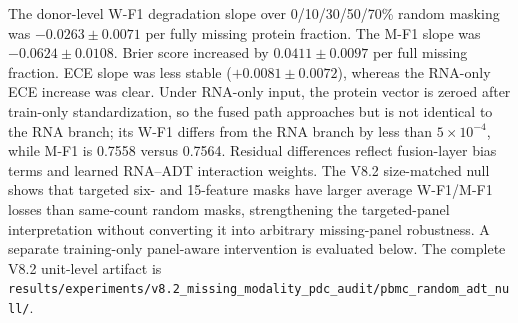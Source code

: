 \documentclass[10pt]{article}
\begin{document}
\begin{table}[H]
\centering
\caption{Frozen-checkpoint performance and calibration under protein-panel masks. Intervals use held-out donor after averaging seeds for the original panel matrix. ECE is top-label expected calibration error from 15 equal-width confidence bins; Brier is the per-cell mean of the multiclass sum of squared probability errors. For ECE and Brier, the worst donor is the maximum value. Marker rows remove six memory-associated or 15 T-cell-associated ADTs; the table explicitly reports removed counts and fractions so targeted and random damage are not conflated. For macro-F1 rows, $\Delta$M-F1 per removed fraction is $(M\!-\!F1_{\mathrm{full}}-M\!-\!F1_{\mathrm{scenario}})/\mathrm{removed\ fraction}$. The V8.2 size-matched rows use 24 frozen donor--seed units, report intervals across those units and leave the worst-donor field unestimated. The final two rows are a separate validation-only scalar-temperature audit on the untouched full-input checkpoints: the temperature was fitted by validation negative log likelihood per donor--seed unit and then applied to test probabilities, without changing the argmax predictions.}
\label{tab:panel}
\scriptsize
\setlength{\tabcolsep}{2.8pt}
\resizebox{\textwidth}{!}{%

}
\end{table}

The donor-level W-F1 degradation slope over 0/10/30/50/70\% random masking was $-0.0263\pm0.0071$ per fully missing protein fraction. The M-F1 slope was $-0.0624\pm0.0108$. Brier score increased by $0.0411\pm0.0097$ per full missing fraction. ECE slope was less stable ($+0.0081\pm0.0072$), whereas the RNA-only ECE increase was clear. Under RNA-only input, the protein vector is zeroed after train-only standardization, so the fused path approaches but is not identical to the RNA branch; its W-F1 differs from the RNA branch by less than $5\times10^{-4}$, while M-F1 is 0.7558 versus 0.7564. Residual differences reflect fusion-layer bias terms and learned RNA--ADT interaction weights. The V8.2 size-matched null shows that targeted six- and 15-feature masks have larger average W-F1/M-F1 losses than same-count random masks, strengthening the targeted-panel interpretation without converting it into arbitrary missing-panel robustness. A separate training-only panel-aware intervention is evaluated below. The complete V8.2 unit-level artifact is \texttt{results/experiments/v8.2\_missing\_modality\_pdc\_audit/pbmc\_random\_adt\_null/}.
\end{document}
